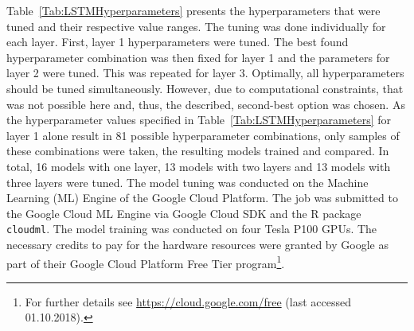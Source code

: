 Table~\ref{Tab:LSTMHyperparameters} presents the hyperparameters that were tuned and their respective value ranges. The tuning was done individually for each layer. First, layer 1 hyperparameters were tuned. The best found hyperparameter combination was then fixed for layer 1 and the parameters for layer 2 were tuned. This was repeated for layer 3. Optimally, all hyperparameters should be tuned simultaneously. However, due to computational constraints, that was not possible here and, thus, the described, second-best option was chosen. As the hyperparameter values specified in Table~\ref{Tab:LSTMHyperparameters} for layer 1 alone result in 81 possible hyperparameter combinations, only samples of these combinations were taken, the resulting models trained and compared. In total, 16 models with one layer, 13 models with two layers and 13 models with three layers were tuned. The model tuning was conducted on the Machine Learning (ML) Engine of the Google Cloud Platform. The job was submitted to the Google Cloud ML Engine via Google Cloud SDK and the R package \texttt{cloudml}. The model training was conducted on four Tesla P100 GPUs. The necessary credits to pay for the hardware resources were granted by Google as part of their Google Cloud Platform Free Tier program\footnote{For further details see \url{https://cloud.google.com/free} (last accessed 01.10.2018).}.

